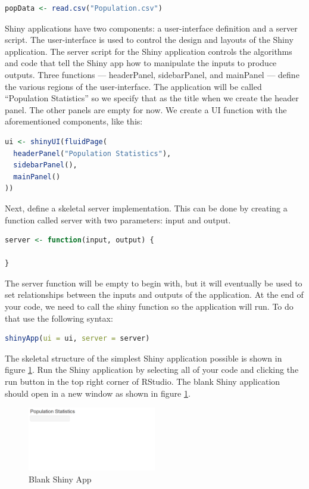 \begin{lstlisting}[language = R]
popData <- read.csv("Population.csv")
\end{lstlisting}
Shiny applications have two components: a user-interface definition and a server script.
The user-interface is used to control the design and layouts of the Shiny application.
The server script for the Shiny application controls the algorithms and code that tell the Shiny app how to manipulate the inputs to produce outputs.\cite{shiny} 
Three functions --- headerPanel, sidebarPanel, and mainPanel --- define the various regions of the user-interface.
The application will be called “Population Statistics” so we specify that as the title when we create the header panel.
The other panels are empty for now.
We create a UI function with the aforementioned components, like this:
\begin{lstlisting}[language = R]
ui <- shinyUI(fluidPage(
  headerPanel("Population Statistics"),
  sidebarPanel(),
  mainPanel()
))
\end{lstlisting}
Next, define a skeletal server implementation. This can be done by creating a function called server with two parameters: input and output.
\begin{lstlisting}[language = R]
server <- function(input, output) {

}
\end{lstlisting}
The server function will be empty to begin with, but it will eventually be used to set relationships between the inputs and outputs of the application. At the end of your code, we need to call the shiny function so the application will run. To do that use the following syntax: 
\begin{lstlisting}[language = R]
shinyApp(ui = ui, server = server)
\end{lstlisting}
The skeletal structure of the simplest Shiny application possible is shown in figure \ref{fig:blank}. 
Run the Shiny application by selecting all of your code and clicking the run button in the top right corner of RStudio.
The blank Shiny application should open in a new window as shown in figure \ref{fig:blank}.
\begin{figure}[h]
   \centering
   \includegraphics[width=0.5\textwidth]{pictures/shiny/blank.PNG} 
   \caption{Blank Shiny App}
   \label{fig:blank}
\end{figure}
